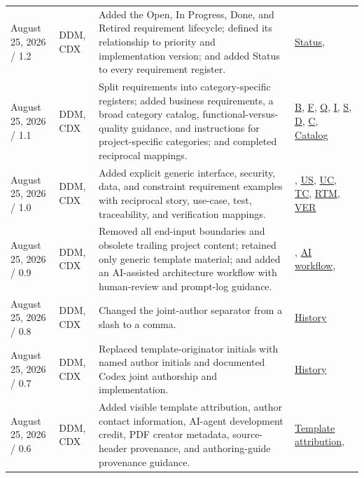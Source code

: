 \begin{tabularx}{\linewidth}{L{3.1cm}L{2.2cm}YL{2.5cm}}
August 25, 2026 / 1.2 & DDM, CDX & Added the Open, In Progress, Done, and Retired requirement lifecycle; defined its relationship to priority and implementation version; and added Status to every requirement register. & \hyperref[Table:RequirementStatusDefinitions]{Status}, \\
August 25, 2026 / 1.1 & DDM, CDX & Split requirements into category-specific registers; added business requirements, a broad category catalog, functional-versus-quality guidance, and instructions for project-specific categories; and completed reciprocal mappings. & \hyperref[Table:BusinessRequirements]{B}, \hyperref[Table:FunctionalRequirements]{F}, \hyperref[Table:QualityRequirements]{Q}, \hyperref[Table:InterfaceRequirements]{I}, \hyperref[Table:SecurityRequirements]{S}, \hyperref[Table:DataRequirements]{D}, \hyperref[Table:ConstraintRequirements]{C}, \hyperref[Table:RequirementCategoryCatalog]{Catalog}\\
August 25, 2026 / 1.0 & DDM, CDX & Added explicit generic interface, security, data, and constraint requirement examples with reciprocal story, use-case, test, traceability, and verification mappings. & , \hyperref[Table:UserStories]{US}, \hyperref[Chapter:UseCases]{UC}, \hyperref[Chapter:Tests]{TC}, \hyperref[Table:TraceabilityMatrix]{RTM}, \hyperref[Table:VerificationRegister]{VER}\\
August 25, 2026 / 0.9 & DDM, CDX & Removed all end-input boundaries and obsolete trailing project content; retained only generic template material; and added an AI-assisted architecture workflow with human-review and prompt-log guidance. & , \hyperref[Section:AIArchitectureWorkflow]{AI workflow}, \\
August 25, 2026 / 0.8 & DDM, CDX & Changed the joint-author separator from a slash to a comma. & \hyperref[Table:DocumentHistory]{History}\\
August 25, 2026 / 0.7 & DDM, CDX & Replaced template-originator initials with named author initials and documented Codex joint authorship and implementation. & \hyperref[Table:DocumentHistory]{History}\\
August 25, 2026 / 0.6 & DDM, CDX & Added visible template attribution, author contact information, AI-agent development credit, PDF creator metadata, source-header provenance, and authoring-guide provenance guidance. & \hyperref[Chapter:TemplateAttribution]{Template attribution}, \\

\end{tabularx}
